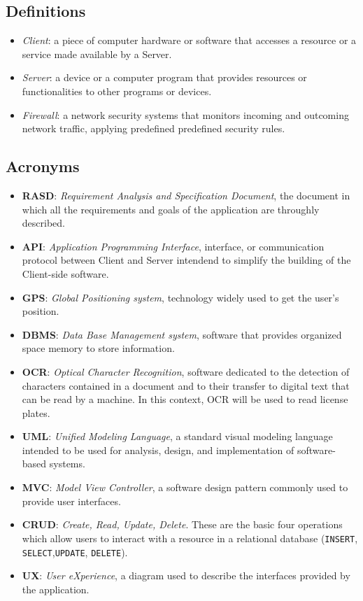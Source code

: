 \documentclass{report}
\begin{document}
\subsection{Definitions}
\begin{itemize}
    \item \textit{Client}: a piece of computer hardware or software that accesses a resource or a service made available by a Server.
    \item \textit{Server}: a device or a computer program that provides resources or functionalities to other programs or devices.
    \item \textit{Firewall}: a network security systems that monitors incoming and outcoming network traffic, applying predefined predefined security rules.
\end{itemize}
\subsection{Acronyms}
\begin{itemize}
    \item \textbf{RASD}: \textit{Requirement Analysis and Specification Document}, the document in which all the requirements and goals of the application are throughly described.
    \item \textbf{API}: \textit{Application Programming Interface}, interface, or communication protocol between Client and Server intendend to simplify the building of the Client-side software.
    \item \textbf{GPS}: \textit{Global Positioning system}, technology widely used to get the user's position.
    \item \textbf{DBMS}: \textit{Data Base Management system}, software that provides organized space memory to store information.
    \item \textbf{OCR}: \textit{Optical Character Recognition}, software dedicated to the detection of characters contained in a document and to their transfer to digital text that can be read by a machine. In this context, OCR will be used to read license plates.
    \item \textbf{UML}: \textit{Unified Modeling Language}, a standard visual modeling language intended to be used for analysis, design, and implementation of software-based systems.
    \item \textbf{MVC}: \textit{Model View Controller}, a software design pattern commonly used to provide user interfaces.
    \item \textbf{CRUD}: \textit{Create, Read, Update, Delete}. These are the basic four operations which allow users to interact with a resource in a relational database (\texttt{INSERT}, \texttt{SELECT},\texttt{UPDATE}, \texttt{DELETE}).
    \item \textbf{UX}: \textit{User eXperience}, a diagram used to describe the interfaces provided by the application.
    \end{itemize}
\end{document}
